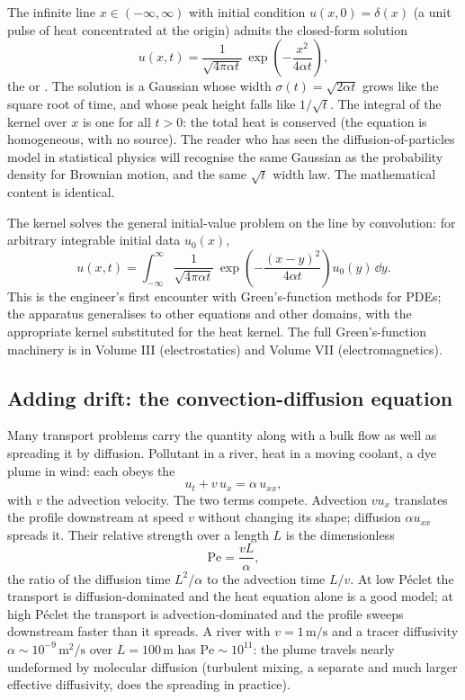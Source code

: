 The infinite line $x \in (-\infty, \infty)$ with initial condition
$u(x, 0) = \delta(x)$ (a unit pulse of heat concentrated at the
origin) admits the closed-form solution
\[
u(x, t) = \frac{1}{\sqrt{4\pi \alpha t}}\, \exp\!\left(-\frac{x^{2}}{4 \alpha t}\right),
\]
the  or . The
solution is a Gaussian whose width $\sigma(t) = \sqrt{2 \alpha t}$
grows like the square root of time, and whose peak height falls
like $1/\sqrt{t}$. The integral of the kernel over $x$ is one for
all $t > 0$: the total heat is conserved (the equation is
homogeneous, with no source). The reader who has seen the
diffusion-of-particles model in statistical physics will
recognise the same Gaussian as the probability density for
Brownian motion, and the same $\sqrt{t}$ width law. The
mathematical content is identical.

The kernel solves the general initial-value problem on the line
by convolution: for arbitrary integrable initial data $u_{0}(x)$,
\[
u(x, t) = \int_{-\infty}^{\infty} \frac{1}{\sqrt{4\pi \alpha t}}\, \exp\!\left(-\frac{(x - y)^{2}}{4 \alpha t}\right) u_{0}(y)\, \dd y.
\]
This is the engineer's first encounter with Green's-function
methods for PDEs; the apparatus generalises to other equations and
other domains, with the appropriate kernel substituted for the
heat kernel. The full Green's-function machinery is in Volume III
(electrostatics) and Volume VII (electromagnetics).

\subsection{Adding drift: the convection-diffusion equation}

Many transport problems carry the quantity along with a bulk flow
as well as spreading it by diffusion. Pollutant in a river, heat in
a moving coolant, a dye plume in wind: each obeys the
\[
u_{t} + v\, u_{x} = \alpha\, u_{xx},
\]
with $v$ the advection velocity. The two terms compete. Advection
$v u_{x}$ translates the profile downstream at speed $v$ without
changing its shape; diffusion $\alpha u_{xx}$ spreads it. Their
relative strength over a length $L$ is the dimensionless
\[
\mathrm{Pe} = \frac{v L}{\alpha},
\]
the ratio of the diffusion time $L^{2}/\alpha$ to the advection
time $L/v$. At low P\'eclet the transport is diffusion-dominated and
the heat equation alone is a good model; at high P\'eclet the
transport is advection-dominated and the profile sweeps downstream
faster than it spreads. A river with $v = 1\,\si{\meter\per\second}$
and a tracer diffusivity $\alpha \sim 10^{-9}\,\si{\meter\squared
\per\second}$ over $L = 100\,\si{\meter}$ has $\mathrm{Pe} \sim
10^{11}$: the plume travels nearly undeformed by molecular
diffusion (turbulent mixing, a separate and much larger effective
diffusivity, does the spreading in practice).

